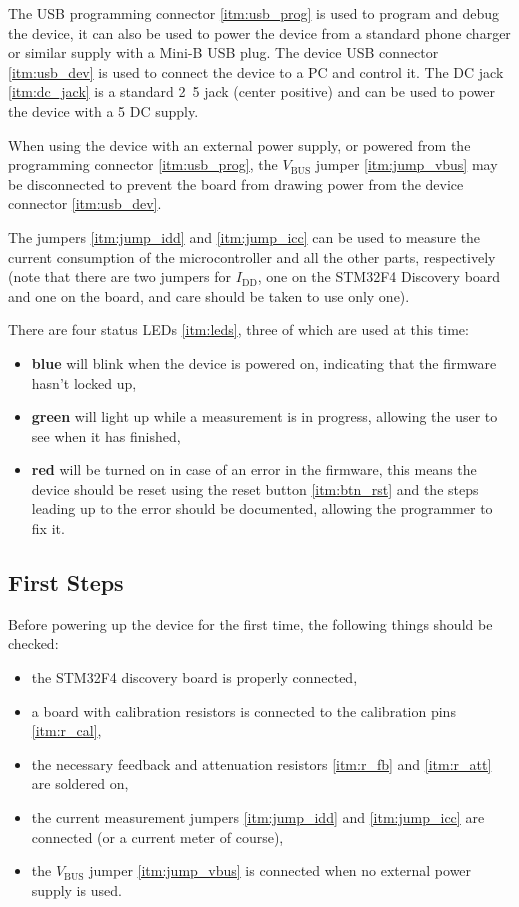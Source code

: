 The USB programming connector \ref{itm:usb_prog} is used to program and debug the device, it can also be used to power
the device from a standard phone charger or similar supply with a Mini-B USB plug.
The device USB connector \ref{itm:usb_dev} is used to connect the device to a PC and control it.
The DC jack \ref{itm:dc_jack} is a standard \unit{2.5}{\milli\meter} jack (center positive) and can be used to
power the device with a \unit{5}{\volt} DC supply.

When using the device with an external power supply, or powered from the programming connector \ref{itm:usb_prog},
the $ V_\text{BUS} $ jumper \ref{itm:jump_vbus} may be disconnected to prevent the board from drawing power from the
device connector \ref{itm:usb_dev}.

The jumpers \ref{itm:jump_idd} and \ref{itm:jump_icc} can be used to measure the current consumption of the
microcontroller and all the other parts, respectively (note that there are two jumpers for $ I_\text{DD} $,
one on the STM32F4 Discovery board and one on the board, and care should be taken to use only one).

There are four status LEDs \ref{itm:leds}, three of which are used at this time:
\begin{itemize}
	\item \textbf{\color{blue} blue} will blink when the device is powered on, indicating that the firmware
    hasn't locked up,
  \item \textbf{\color{OliveGreen} green} will light up while a measurement is in progress, allowing the user
    to see when it has finished,
  \item \textbf{\color{red} red} will be turned on in case of an error in the firmware, this means the device
    should be reset using the reset button \ref{itm:btn_rst} and the steps leading up to the error should be
    documented, allowing the programmer to fix it.
\end{itemize}

\subsection{First Steps}

Before powering up the device for the first time, the following things should be checked:
\begin{itemize}
	\item the STM32F4 discovery board is properly connected,
  \item a board with calibration resistors is connected to the calibration pins \ref{itm:r_cal},
  \item the necessary feedback and attenuation resistors \ref{itm:r_fb} and \ref{itm:r_att} are soldered on,
  \item the current measurement jumpers \ref{itm:jump_idd} and \ref{itm:jump_icc} are connected
    (or a current meter of course),
  \item the $ V_\text{BUS} $ jumper \ref{itm:jump_vbus} is connected when no external power supply is used.
\end{itemize}

